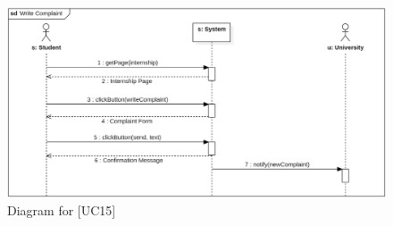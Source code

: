 \begin{figure} [H]
    \centering
    \includegraphics[width=1\linewidth]{Use Cases Images/write_complaint.png}
    \caption{Diagram for [UC15]}
    \label{fig: Write Complaint Diagram}
\end{figure}

